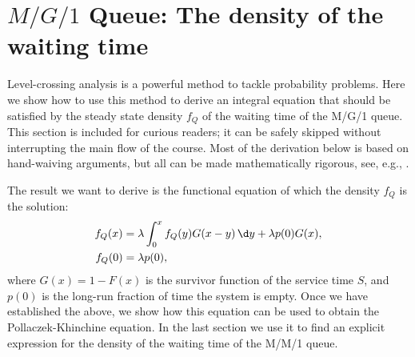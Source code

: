 \section{$M/G/1$ Queue: The density of the waiting time}

Level-crossing analysis is a powerful method to tackle probability problems.
Here we show how to use this method to derive an integral equation that should be satisfied by the steady state density $f_Q$ of the waiting time of the M/G/1 queue.
This section is included for curious readers; it can be safely skipped without interrupting the main flow of the course.
Most of the derivation below is based on hand-waiving arguments, but all can be made mathematically rigorous, see, e.g., \cite{brill08:_level_cross_method_stoch_model}.

The result we want to derive is the functional equation of which the
density $f_Q$ is the solution:
\begin{equation}\label{eq:51}
\begin{split}
 f_Q(x) &= \lambda \int_0^x f_Q(y) G(x-y) \,\d y + \lambda p(0) G(x), \\
 f_Q(0) &= \lambda p(0),
\end{split}
\end{equation}
where $G(x) = 1 - F(x)$ is the survivor function of the service time
$S$, and $p(0)$ is the long-run fraction of time the system is empty. 
Once we have established the above, we show how this equation can be
used to obtain the Pollaczek-Khinchine equation. In the last section
we use it to find an explicit expression for the density of the
waiting time of the M/M/1 queue.

